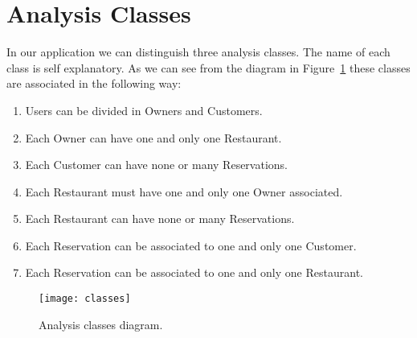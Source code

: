 \section{Analysis Classes}

In our application we can distinguish three analysis classes. The name of each
class is self explanatory. As we can see from the diagram in
Figure~\ref{fig:classes} these classes are associated in the following way:

\begin{enumerate}
	\item Users can be divided in Owners and Customers.
	\item Each Owner can have one and only one Restaurant.
	\item Each Customer can have none or many Reservations.
	\item Each Restaurant must have one and only one Owner associated.
	\item Each Restaurant can have none or many Reservations.
	\item Each Reservation can be associated to one and only one Customer.
	\item Each Reservation can be associated to one and only one Restaurant.
\end{enumerate}

\begin{figure}[ht]
	\texttt{[image: classes]}
	\caption{Analysis classes diagram.}
	\label{fig:classes}
\end{figure}
